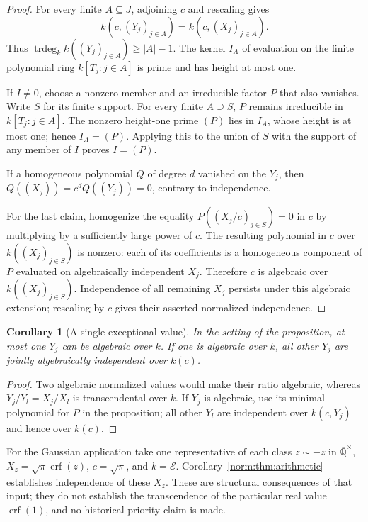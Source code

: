 \documentclass[11pt,a4paper]{article}
\newcommand{\Qbar}{\overline{\mathbb Q}}
\newcommand{\E}{\mathcal E}
\newtheorem{corollary}[theorem]{Corollary}
\theoremstyle{definition}
\theoremstyle{remark}
\numberwithin{equation}{section}
\begin{document}
\begin{proof}
For every finite $A\subseteq J$, adjoining $c$ and rescaling gives
\[
 k(c,(Y_j)_{j\in A})=k(c,(X_j)_{j\in A}).
\]
Thus $\operatorname{trdeg}_k k((Y_j)_{j\in A})\geq |A|-1$.
The kernel $I_A$ of evaluation on the finite polynomial ring
$k[T_j:j\in A]$ is prime and has height at most one.

If $I\ne0$, choose a nonzero member and an irreducible factor $P$ that
also vanishes.  Write $S$ for its finite support.  For every finite
$A\supseteq S$, $P$ remains irreducible in $k[T_j:j\in A]$.
The nonzero height-one prime $(P)$ lies in $I_A$, whose height is at
most one; hence $I_A=(P)$.  Applying this to the union of $S$ with
the support of any member of $I$ proves $I=(P)$.

If a homogeneous polynomial $Q$ of degree $d$ vanished on the $Y_j$,
then $Q((X_j))=c^dQ((Y_j))=0$, contrary to independence.

For the last claim, homogenize the equality $P((X_j/c)_{j\in S})=0$
in $c$ by multiplying by a sufficiently large power of $c$.
The resulting polynomial in $c$ over $k((X_j)_{j\in S})$ is nonzero:
each of its coefficients is a homogeneous component of $P$ evaluated
on algebraically independent $X_j$.  Therefore $c$ is algebraic over
$k((X_j)_{j\in S})$.  Independence of all remaining $X_j$ persists
under this algebraic extension; rescaling by $c$ gives their asserted
normalized independence.
\end{proof}

\begin{corollary}[A single exceptional value]\label{norm:cor:single-exception}
In the setting of the proposition, at most one $Y_j$ can be algebraic
over $k$.  If one is algebraic over $k$, all other $Y_j$ are jointly
algebraically independent over $k(c)$.
\end{corollary}

\begin{proof}
Two algebraic normalized values would make their ratio algebraic,
whereas $Y_j/Y_l=X_j/X_l$ is transcendental over $k$.  If $Y_j$ is
algebraic, use its minimal polynomial for $P$ in the proposition;
all other $Y_l$ are independent over $k(c,Y_j)$ and hence over
$k(c)$.
\end{proof}

For the Gaussian application take one representative of each class
$z\sim-z$ in $\Qbar^{\times}$,
$X_z=\sqrt\pi\operatorname{erf}(z)$, $c=\sqrt\pi$, and
$k=\E$.  Corollary~\ref{norm:thm:arithmetic} establishes independence of
these $X_z$.  These are structural consequences of that input;
they do not establish the transcendence of the particular real value
$\operatorname{erf}(1)$, and no historical priority claim is made.
\end{document}
